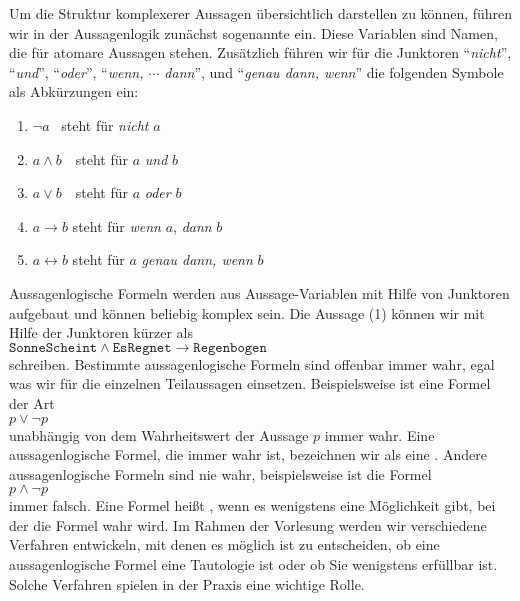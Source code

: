 Um die Struktur komplexerer Aussagen übersichtlich darstellen zu können, führen wir in der Aussagenlogik zunächst sogenannte
 ein.  Diese Variablen sind Namen, die für atomare Aussagen stehen.
Zusätzlich führen wir für die Junktoren
``\textsl{nicht}'', ``\textsl{und}'', ``\textsl{oder}'', ``\textsl{wenn, $\cdots$ dann}'', und ``\textsl{genau dann, wenn}'' die
folgenden Symbole als Abkürzungen ein:
\begin{enumerate}
\item $\neg a$ \quad\quad\ steht für \quad \textsl{nicht} $a$ 
      \vspace*{-0.2cm}

\item $a \wedge b$ \,\quad\ steht für \quad $a$ \textsl{und} $b$
      \vspace*{-0.2cm}

\item $a \vee b$ \,\quad\ steht für \quad $a$ \textsl{oder} $b$
      \vspace*{-0.2cm}

\item $a \rightarrow b$   \quad steht für \quad \textsl{wenn} $a$, \textsl{dann} $b$
      \vspace*{-0.2cm}

\item $a \leftrightarrow b$ \quad steht für \quad  $a$ \textsl{genau dann, wenn} $b$
\end{enumerate}
Aussagenlogische Formeln werden aus Aussage-Variablen mit Hilfe von Junktoren aufgebaut
und können beliebig komplex sein.  Die Aussage (1) können wir mit Hilfe der Junktoren  kürzer als
 \\[0.2cm]
\hspace*{1.3cm}
$\texttt{SonneScheint} \wedge \texttt{EsRegnet} \rightarrow \texttt{Regenbogen}$ 
\\[0.2cm]
schreiben.  Bestimmte aussagenlogische Formeln sind offenbar immer wahr, egal was
 wir für die einzelnen Teilaussagen einsetzen.  Beispielsweise ist eine Formel der Art
\\[0.2cm]
\hspace*{1.3cm}
$p \vee \neg p$
\\[0.2cm]
unabhängig von dem Wahrheitswert der Aussage $p$ immer wahr.  Eine aussagenlogische
Formel, die immer wahr ist, bezeichnen wir als eine .  Andere
aussagenlogische Formeln sind nie wahr, beispielsweise ist die Formel
\\[0.2cm]
\hspace*{1.3cm}
$p \wedge \neg p$
\\[0.2cm]
immer falsch.  Eine Formel heißt , wenn es wenigstens eine Möglichkeit
gibt, bei der die Formel wahr wird.  Im Rahmen der Vorlesung werden wir verschiedene Verfahren
entwickeln, mit denen es möglich ist zu entscheiden, ob eine aussagenlogische Formel eine
Tautologie ist oder ob Sie wenigstens erfüllbar ist.  Solche Verfahren spielen
in der Praxis eine wichtige Rolle.

